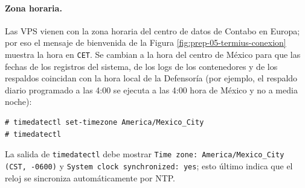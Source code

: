 \paragraph{Zona horaria.} Las VPS vienen con la zona horaria del centro de datos de Contabo en Europa; por eso el mensaje de bienvenida de la Figura \ref{fig:prep-05-termius-conexion} muestra la hora en \texttt{CET}. Se cambian a la hora del centro de México para que las fechas de los registros del sistema, de los logs de los contenedores y de los respaldos coincidan con la hora local de la Defensoría (por ejemplo, el respaldo diario programado a las 4:00 se ejecuta a las 4:00 hora de México y no a media noche):
\begin{lstlisting}
# timedatectl set-timezone America/Mexico_City
# timedatectl
\end{lstlisting}
La salida de \texttt{timedatectl} debe mostrar \texttt{Time zone: America/Mexico\_City (CST, -0600)} y \texttt{System clock synchronized: yes}; esto último indica que el reloj se sincroniza automáticamente por NTP.


